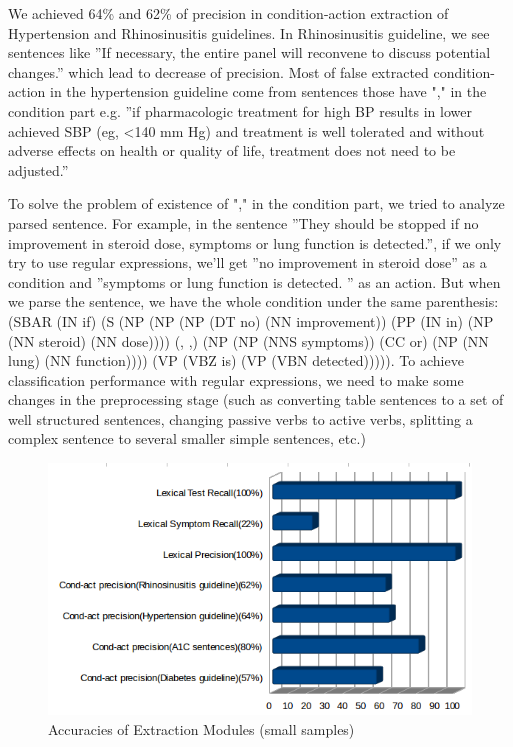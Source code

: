 \documentclass[12pt,letterpaper]{article}
\begin{document}
We achieved 64\% and 62\% of precision in condition-action extraction of Hypertension \cite{doi:10.1001/jama.2013.284427} and Rhinosinusitis\cite{chow2012idsa} guidelines. In Rhinosinusitis guideline, we see sentences like ''If necessary, the entire panel will reconvene to discuss potential changes.'' which lead to decrease of precision. Most of false extracted condition-action in the hypertension guideline come from sentences those have "," in the condition part e.g. ''if pharmacologic treatment for high BP results in lower achieved SBP (eg, \textless 140 mm Hg) and treatment is well tolerated and without adverse effects on health or quality of life, treatment does not need to be adjusted.''

To solve the problem of existence of "," in the condition part, we tried to analyze parsed sentence. For example, in the sentence ''They should be stopped if no improvement in steroid dose, symptoms or lung function is detected.'', if we only try to use regular expressions, we'll get ''no improvement in steroid dose'' as a condition and ''symptoms or lung function is detected. '' as an action. But when we parse the sentence, we have the whole condition under the same parenthesis:(SBAR (IN if) (S (NP (NP (NP (DT no) (NN improvement)) (PP (IN in) (NP (NN steroid) (NN dose)))) (, ,) (NP (NP (NNS symptoms)) (CC or) (NP (NN lung) (NN function)))) (VP (VBZ is) (VP (VBN detected))))).
To achieve classification performance with regular expressions, we need to make some changes in the preprocessing stage (such as converting table sentences to a set of well structured sentences, changing passive verbs to active verbs, splitting a complex sentence to several smaller simple sentences, etc.)

\begin{figure}
\includegraphics[width=\textwidth]{accuracies}
\caption{Accuracies of Extraction Modules (small samples)}
\end{figure}
\end{document}

